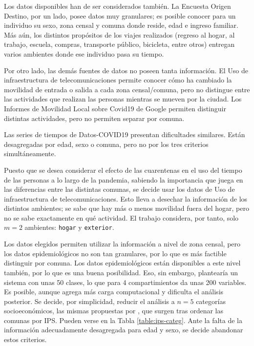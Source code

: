 Los datos disponibles han de ser considerados también. La Encuesta Origen Destino, por un lado, posee datos muy granulares; es posible conocer para un individuo su sexo, zona censal y comuna donde reside, edad e ingreso familiar. Más aún, los distintos propósitos de los viajes realizados (regreso al hogar, al trabajo, escuela, compras, transporte público, bicicleta, entre otros) entregan varios ambientes donde ese individuo pasa su tiempo. 

Por otro lado, las demás fuentes de datos no poseen tanta información. El Uso de infraestructura de telecomunicaciones permite conocer cómo ha cambiado la movilidad de entrada o salida a cada zona censal/comuna, pero no distingue entre las actividades que realizan las personas mientras se mueven por la ciudad. Los Informes de Movilidad Local sobre Covid19 de Google permiten distinguir distintas actividades, pero no permiten separar por comuna.

Las series de tiempos de Datos-COVID19 presentan dificultades similares. Están desagregadas por edad, sexo o comuna, pero no por los tres criterios simultáneamente.

Puesto que se desea considerar el efecto de las cuarentenas en el uso del tiempo de las personas a lo largo de la pandemia, sabiendo la importancia que juega en las diferencias entre las distintas comunas, se decide usar los datos de Uso de infraestructura de telecomunicaciones. Esto lleva a desechar la información de los distintos ambientes; se sabe que hay más o menos movilidad fuera del hogar, pero no se sabe exactamente en qué actividad. El trabajo considera, por tanto, solo \(m = 2\) ambientes: \texttt{hogar} y \texttt{exterior}. 

Los datos elegidos permiten utilizar la información a nivel de zona censal, pero los datos epidemiológicos no son tan granulares, por lo que es más factible distinguir por comuna. Los datos epidemiológicos están disponibles a este nivel también, por lo que es una buena posibilidad. Eso, sin embargo, plantearía un sistema con unas 50 clases, lo que para 4 compartimientos da unas 200 variables. Es posible, aunque agrega más carga computacional y dificulta el análisis posterior. Se decide, por simplicidad, reducir el análisis a \(n = 5\) categorías socioeconómicos, las mismas propuestas por \cite{SEREMIRM2019}, que surgen tras ordenar las comunas por IPS. Pueden verse en la Tabla \ref{table:ips-categ}. Ante la falta de la información adecuadamente desagregada para edad y sexo, se decide abandonar estos criterios.


